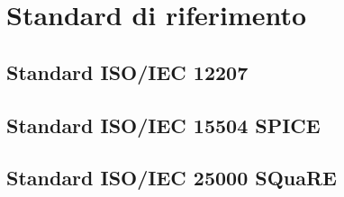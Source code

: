 \appendix
\section{Standard di riferimento}
\subsection{Standard ISO/IEC 12207}
\subsection{Standard ISO/IEC 15504 SPICE}
\subsection{Standard ISO/IEC 25000 SQuaRE}
